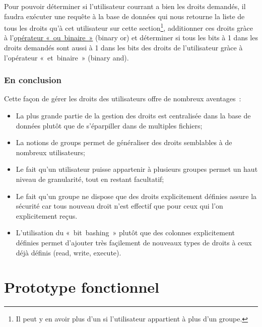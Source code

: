 \documentclass[letter, 10pt]{report}
\begin{document}
Pour pouvoir déterminer si l'utilisateur courrant a bien les droits demandés, il faudra exécuter une requête à la base de données qui nous retourne la liste de tous les droits qu'à cet utilisateur sur cette section\footnote{Il peut y en avoir plus d'un si l'utilisateur appartient à plus d'un groupe.}, additionner ces droits gràce à l'\href{http://www.php.net/manual/en/language.operators.bitwise.php}{opérateur «~ou~binaire~»} (binary or) et déterminer si tous les bits à 1 dans les droits demandés sont aussi à 1 dans les bits des droits de l'utilisateur gràce à l'opérateur «~et~binaire~» (binary and).

\subsection{En conclusion}
Cette façon de gérer les droits des utilisateurs offre de nombreux aventages~:

\begin{itemize}
	\item La plus grande partie de la gestion des droits est centralisée dans la base de données plutôt que de s'éparpiller dans de multiples fichiers;
	\item La notions de groups permet de généraliser des droits semblables à de nombreux utilisateurs;
	\item Le fait qu'un utilisateur puisse appartenir à plusieurs groupes permet un haut niveau de granularité, tout en restant facultatif;
	\item Le fait qu'un groupe ne dispose que des droits explicitement définies assure la sécurité car tous nouveau droit n'est effectif que pour ceux qui l'on explicitement reçus.
	\item L'utilisation du «~bit~bashing~» plutôt que des colonnes explicitement définies permet d'ajouter très façilement de nouveaux types de droits à ceux déjà définis (read, write, execute).
\end{itemize}

\chapter{Prototype fonctionnel}
\end{document}
